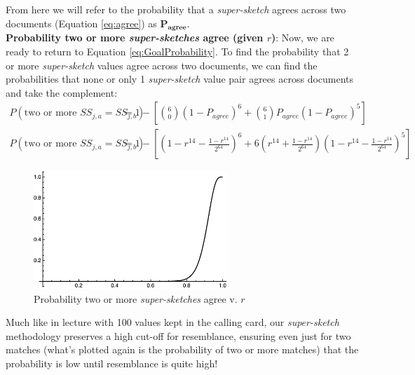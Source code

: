 \documentclass[conference]{styles/acmsiggraph}
\newcommand{\?}{\stackrel{?}{=}}
\begin{document}
From here we will refer to the probability that a \textit{super-sketch} agrees across two documents (Equation \ref{eq:agree}) as $\boxed{\mathbf{P_{agree}}}$.\\

\textbf{Probability two or more \textit{super-sketches} agree (given $r$)}: 
Now, we are ready to return to Equation \ref{eq:GoalProbability}.  To find the probability that 2 or more \textit{super-sketch} values agree across two documents, we can find the probabilities that none or only 1 \textit{super-sketch} value pair agrees across documents and take the complement:
\begin{align}
    P(\text{two or more } SS_{j,a} = SS_{j,b}) &= 1 - \left [ {6 \choose 0} (1-P_{agree})^6 + {6 \choose 1}P_{agree}(1-P_{agree})^5 \right] \\
    P(\text{two or more } SS_{j,a} = SS_{j,b}) &= 1 - \left[ \left (1 - r^{14} - \frac{1 - r^{14}}{2^{64}}\right )^6 + 6\left (r^{14} + \frac{1 - r^{14}}{2^{64}}\right )\left (1 - r^{14} - \frac{1 - r^{14}}{2^{64}}\right )^5\right]
\end{align}

\begin{figure}[h!]
    \centering
    \includegraphics[width=0.65\textwidth]{Problem3Figs/64-bit.png}
    \caption{Probability two or more \textit{super-sketches} agree v. $r$}
    \label{fig:64-bit}
\end{figure}
\FloatBarrier

Much like in lecture with 100 values kept in the calling card, our \textit{super-sketch} methodology preserves a high cut-off for resemblance, ensuring even just for two matches (what's plotted again is the probability of two or more matches) that the probability is low until resemblance is quite high!
\end{document}
